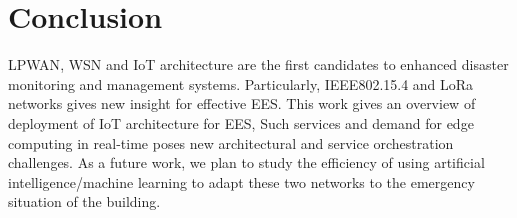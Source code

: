 \section{Conclusion} \label{sec:Conclusion}





\ac{LPWAN},
	\ac{WSN} and \ac{IoT} architecture are the first candidates to enhanced disaster monitoring and management systems.
Particularly,
	IEEE802.15.4 and LoRa networks gives new insight for effective \ac{EES}.
This work gives an overview of deployment of \ac{IoT} architecture for \ac{EES},
	Such services and demand for edge computing in real-time poses new architectural and service orchestration challenges.
As a future work,
	we plan to study the efficiency of using artificial intelligence/machine learning to adapt these two networks to the emergency situation of the building.



